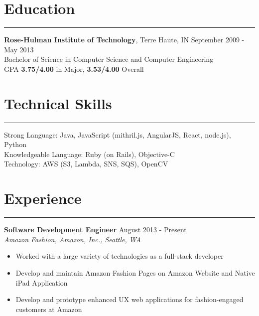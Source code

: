 \documentclass[line]{res} %
\begin{document}

\address{
  2801 1st Ave, Unit 613 \\
  Seattle, WA 98121 \\
  (812) 575-0373 \\
  simon@divby0.io \\
  \underline{http://www.divby0.io}
}
\address{\textbf{Open to Relocation}}

\begin{resume}

  \section{Education}
  \rule{\textwidth}{1pt}
    \textbf{Rose-Hulman Institute of Technology}, Terre Haute, IN
    \hfill September 2009 - May 2013 \\
    Bachelor of Science in Computer Science and Computer Engineering \\
    GPA \textbf{3.75/4.00} in Major, \textbf{3.53/4.00} Overall

  \section{Technical Skills}
  \rule{\textwidth}{1pt}
    Strong Language: Java, JavaScript (mithril.js, AngularJS, React, node.js), Python \\
    Knowledgeable Language: Ruby (on Rails), Objective-C \\
    Technology: AWS (S3, Lambda, SNS, SQS), OpenCV

  \section{Experience}
  \rule{\textwidth}{1pt}
    \textbf{Software Development Engineer}
    \hfill August 2013 - Present \\
    \textit{Amazon Fashion, Amazon, Inc., Seattle, WA}
    \begin{itemize} \itemsep -2pt  %
      \item Worked with a large variety of technologies as a full-stack developer
      \item Develop and maintain Amazon Fashion Pages on Amazon Website and Native iPad Application
      \item Develop and prototype enhanced UX web applications for fashion-engaged customers at Amazon
    \end{itemize}



\end{resume}
\end{document}
